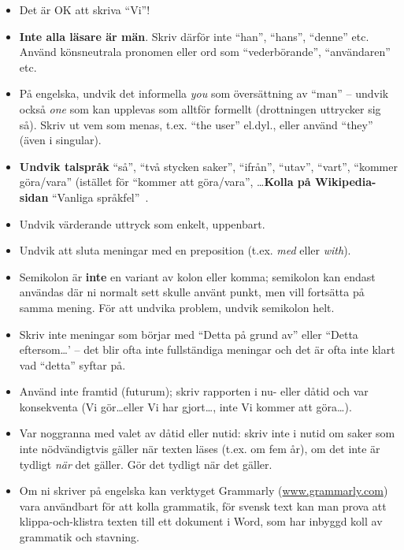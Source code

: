 \begin{itemize}
\item    Det är OK att skriva ``Vi''!

\item    \textbf{Inte alla läsare är män}.  Skriv därför inte ``han'', ``hans'', ``denne'' etc.  Använd könsneutrala pronomen eller ord som ``vederbörande'', ``användaren'' etc. 

\item På engelska, undvik det informella \emph{you} som översättning av ``man'' -- undvik också \emph{one} som kan upplevas som alltför formellt (drottningen uttrycker sig så). Skriv ut vem som menas, t.ex. ``the user'' el.dyl., eller använd ``they'' (även i singular).

\item    \textbf{Undvik talspråk} ``så'', ``två stycken saker'', ``ifrån'', ``utav'', ``vart'', ``kommer göra/vara'' (istället för ``kommer att göra/vara'', \ldots \textbf{Kolla på Wikipedia-sidan} ``Vanliga språkfel''~\cite{wp:sprakfel}.

\item    Undvik värderande uttryck som enkelt, uppenbart.

\item Undvik att sluta meningar med en preposition (t.ex. \emph{med} eller \emph{with}).

\item    Semikolon är \textbf{inte} en variant av kolon eller komma; semikolon kan endast an\-vän\-das där ni normalt sett skulle använt punkt, men vill fortsätta på samma mening. För att undvika problem, undvik semikolon helt.

\item    Skriv inte meningar som börjar med ``Detta på grund av'' eller ``Detta eftersom\ldots' -- det blir ofta inte fullständiga meningar och det är ofta inte klart vad ``detta'' syftar på.

\item    Använd inte framtid (futurum); skriv rapporten i nu- eller dåtid och var konsekventa (Vi gör\ldots eller Vi har gjort\ldots, inte Vi kommer att göra\ldots). 

\item Var noggranna med valet av dåtid eller nutid: skriv inte i nutid om saker som inte nödvändigtvis gäller när texten läses (t.ex. om fem år), om det inte är tydligt \emph{när} det gäller. Gör det tydligt när det gäller.

\item Om ni skriver på engelska kan verktyget Grammarly (\url{www.grammarly.com}) vara användbart för att kolla grammatik, för svensk text kan man prova att klippa-och-klistra texten till ett dokument i Word, som har inbyggd koll av grammatik och stavning.


\end{itemize}

